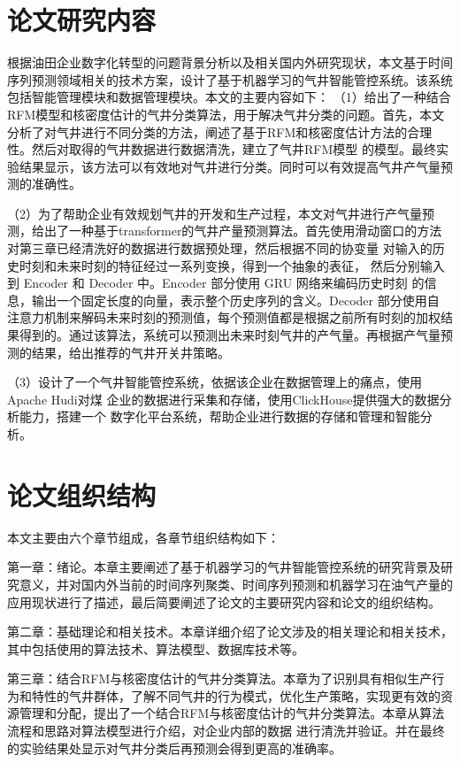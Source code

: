 \section{论文研究内容}
根据油田企业数字化转型的问题背景分析以及相关国内外研究现状，本文基于时间序列预测领域相关的技术方案，设计了基于机器学习的气井智能管控系统。该系统包括智能管理模块和数据管理模块。本文的主要内容如下：
（1）给出了一种结合RFM模型和核密度估计的气井分类算法，用于解决气井分类的问题。首先，本文分析了对气井进行不同分类的方法，阐述了基于RFM和核密度估计方法的合理性。然后对取得的气井数据进行数据清洗，建立了气井RFM模型
的模型。最终实验结果显示，该方法可以有效地对气井进行分类。同时可以有效提高气井产气量预测的准确性。

（2）为了帮助企业有效规划气井的开发和生产过程，本文对气井进行产气量预测，给出了一种基于transformer的气井产量预测算法。首先使用滑动窗口的方法对第三章已经清洗好的数据进行数据预处理，然后根据不同的协变量
对输入的历史时刻和未来时刻的特征经过一系列变换，得到一个抽象的表征，
然后分别输入到 Encoder 和 Decoder 中。Encoder 部分使用 GRU 网络来编码历史时刻
的信息，输出一个固定长度的向量，表示整个历史序列的含义。Decoder 部分使用自
注意力机制来解码未来时刻的预测值，每个预测值都是根据之前所有时刻的加权结
果得到的。通过该算法，系统可以预测出未来时刻气井的产气量。再根据产气量预测的结果，给出推荐的气井开关井策略。

（3）设计了一个气井智能管控系统，依据该企业在数据管理上的痛点，使用Apache Hudi对煤
企业的数据进行采集和存储，使用ClickHouse提供强大的数据分析能力，搭建一个
数字化平台系统，帮助企业进行数据的存储和管理和智能分析。
\section{论文组织结构}
本文主要由六个章节组成，各章节组织结构如下：

第一章：绪论。本章主要阐述了基于机器学习的气井智能管控系统的研究背景及研究意义，并对国内外当前的时间序列聚类、时间序列预测和机器学习在油气产量的应用现状进行了描述，最后简要阐述了论文的主要研究内容和论文的组织结构。

第二章：基础理论和相关技术。本章详细介绍了论文涉及的相关理论和相关技术，其中包括使用的算法技术、算法模型、数据库技术等。

第三章：结合RFM与核密度估计的气井分类算法。本章为了识别具有相似生产行为和特性的气井群体，了解不同气井的行为模式，优化生产策略，实现更有效的资源管理和分配，提出了一个结合RFM与核密度估计的气井分类算法。本章从算法流程和思路对算法模型进行介绍，对企业内部的数据
进行清洗并验证。并在最终的实验结果处显示对气井分类后再预测会得到更高的准确率。

